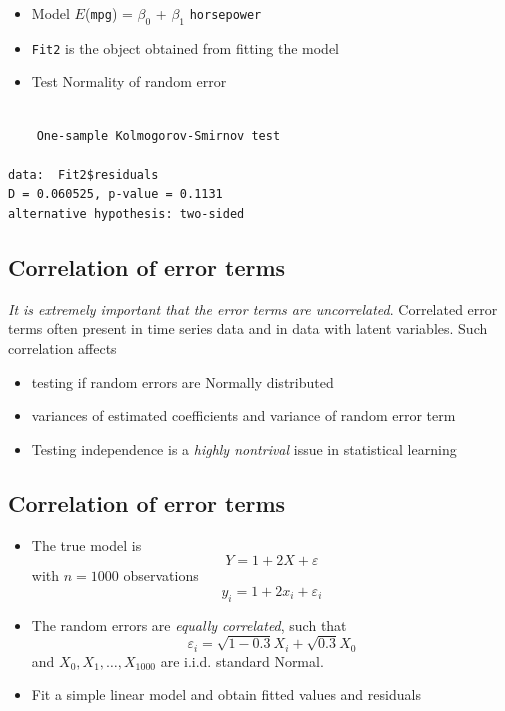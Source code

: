 \documentclass[]{article}
\providecommand{\tightlist}{%
  \setlength{\itemsep}{0pt}\setlength{\parskip}{0pt}}
\begin{document}
\begin{itemize}
\tightlist
\item
  Model \(E\)(\texttt{mpg}) = \(\beta_0\) + \(\beta_1\)
  \texttt{horsepower}
\item
  \texttt{Fit2} is the object obtained from fitting the model
\item
  Test Normality of random error
\end{itemize}

\begin{verbatim}

    One-sample Kolmogorov-Smirnov test

data:  Fit2$residuals
D = 0.060525, p-value = 0.1131
alternative hypothesis: two-sided
\end{verbatim}

\subsection{Correlation of error
terms}\label{correlation-of-error-terms}

\emph{It is extremely important that the error terms are uncorrelated}.
Correlated error terms often present in time series data and in data
with latent variables. Such correlation affects

\begin{itemize}
\tightlist
\item
  testing if random errors are Normally distributed
\item
  variances of estimated coefficients and variance of random error
  term\\
\item
  Testing independence is a \emph{highly nontrival} issue in statistical
  learning
\end{itemize}

\subsection{Correlation of error
terms}\label{correlation-of-error-terms-1}

\begin{itemize}
\item
  The true model is \[Y = 1 + 2X + \varepsilon\] with \(n=1000\)
  observations \[y_{i} = 1+ 2 x_{i} + \varepsilon_{i}\]
\item
  The random errors are \emph{equally correlated}, such that
  \[\varepsilon_{i} =
  \sqrt{1-0.3}X_{i} + \sqrt{0.3} X_{0}\] and
  \(X_{0}, X_{1}, \ldots, X_{1000}\) are i.i.d. standard Normal.
\item
  Fit a simple linear model and obtain fitted values and residuals
\end{itemize}
\end{document}
